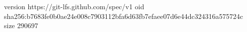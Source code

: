 version https://git-lfs.github.com/spec/v1
oid sha256:b7683fe0b0ae24e008c7903112bfa6d63fb7efaee07d6e44dc324316a575724c
size 290697

